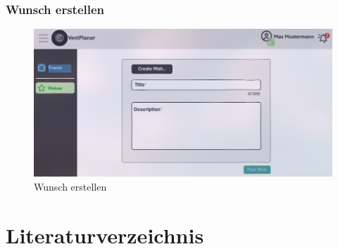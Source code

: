 \documentclass[a4paper,12pt]{article}
\begin{document}
\subsubsection{Wunsch erstellen}
\begin{figure}[H]
    \centering
    \includegraphics[width=1\textwidth]{Abbildungen/wishes/create_wish.png}
    \caption{Wunsch erstellen}
    \label{fig:create_wish}
\end{figure}

\newpage


\section{Literaturverzeichnis}
\end{document}
